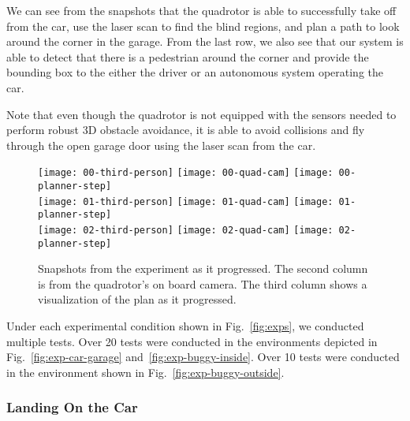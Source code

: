 We can see from the snapshots that the quadrotor is able to successfully take
off from the car, use the laser scan to find the blind regions, and plan a path
to look around the corner in the garage. From the last row, we also see that
our system is able to detect that there is a pedestrian around the corner and
provide the bounding box to the either the driver or an autonomous system
operating the car.

Note that even though the quadrotor is not equipped with the sensors needed to
perform robust 3D obstacle avoidance, it is able to avoid collisions and fly
through the open garage door using the laser scan from the car.

\begin{figure}[h!]

    \centering

    \texttt{[image: 00-third-person]}
    \texttt{[image: 00-quad-cam]}
    \texttt{[image: 00-planner-step]} \\
    \vspace*{1mm}
    \texttt{[image: 01-third-person]}
    \texttt{[image: 01-quad-cam]}
    \texttt{[image: 01-planner-step]} \\
    \vspace*{1mm}
    \texttt{[image: 02-third-person]}
    \texttt{[image: 02-quad-cam]}
    \texttt{[image: 02-planner-step]}

    \caption{Snapshots from the experiment as it progressed. The second column
        is from the quadrotor's on board camera. The third column shows a
    visualization of the plan as it progressed.}

    \label{fig:experiment}

\end{figure}

Under each experimental condition shown in Fig.~\ref{fig:exps}, we conducted
multiple tests. Over 20 tests were conducted in the environments depicted in
Fig.~\ref{fig:exp-car-garage} and~\ref{fig:exp-buggy-inside}. Over 10 tests
were conducted in the environment shown in Fig.~\ref{fig:exp-buggy-outside}.

\subsubsection{Landing On the Car}

